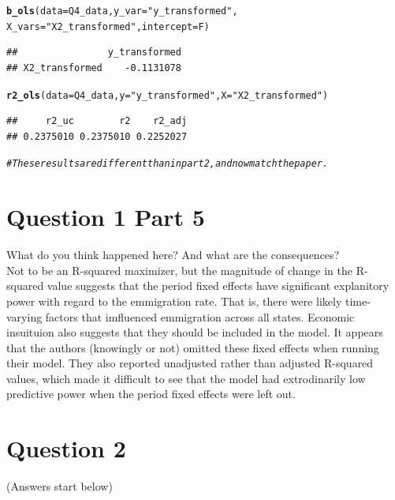 \documentclass[english, 11pt]{article}\usepackage[]{graphicx}\usepackage[]{color}
\makeatletter
\newcommand{\hlstr}[1]{\textcolor[rgb]{0.192,0.494,0.8}{#1}}%
\newcommand{\hlcom}[1]{\textcolor[rgb]{0.678,0.584,0.686}{\textit{#1}}}%
\newcommand{\hlstd}[1]{\textcolor[rgb]{0.345,0.345,0.345}{#1}}%
\newcommand{\hlkwc}[1]{\textcolor[rgb]{0.333,0.667,0.333}{#1}}%
\newcommand{\hlkwd}[1]{\textcolor[rgb]{0.737,0.353,0.396}{\textbf{#1}}}%
\newenvironment{kframe}{%
 \def\at@end@of@kframe{}%
 \ifinner\ifhmode%
  \def\at@end@of@kframe{\end{minipage}}%
  \begin{minipage}{\columnwidth}%
 \fi\fi%
 \def\FrameCommand##1{\hskip\@totalleftmargin \hskip-\fboxsep
 \colorbox{shadecolor}{##1}\hskip-\fboxsep
     \hskip-\linewidth \hskip-\@totalleftmargin \hskip\columnwidth}%
 \MakeFramed {\advance\hsize-\width
   \@totalleftmargin\z@ \linewidth\hsize
   \@setminipage}}%
 {\par\unskip\endMakeFramed%
 \at@end@of@kframe}
\newenvironment{knitrout}{}{} %
\makeatother
\begin{document}
\begin{knitrout}
\begin{kframe}
\begin{alltt}
\hlkwd{b_ols}\hlstd{(}\hlkwc{data} \hlstd{= Q4_data,} \hlkwc{y_var} \hlstd{=} \hlstr{"y_transformed"}\hlstd{,}
      \hlkwc{X_vars} \hlstd{=} \hlstr{"X2_transformed"}\hlstd{,} \hlkwc{intercept} \hlstd{= F)}
\end{alltt}
\begin{verbatim}
##                y_transformed
## X2_transformed    -0.1131078
\end{verbatim}
\begin{alltt}
\hlkwd{r2_ols}\hlstd{(}\hlkwc{data} \hlstd{= Q4_data,} \hlkwc{y} \hlstd{=} \hlstr{"y_transformed"}\hlstd{,} \hlkwc{X} \hlstd{=} \hlstr{"X2_transformed"}\hlstd{)}
\end{alltt}
\begin{verbatim}
##     r2_uc        r2    r2_adj 
## 0.2375010 0.2375010 0.2252027
\end{verbatim}
\begin{alltt}
\hlcom{# These results are different than in part 2, and now match the paper. }
\end{alltt}
\end{kframe}
\end{knitrout}

\noindent \section*{Question 1 Part 5} What do you think happened here? And what are the consequences?\\
\vspace{2mm}
\newline
\noindent Not to be an R-squared maximizer, but the magnitude of change in the R-squared value suggests that the period fixed effects have significant explanitory power with regard to the emmigration rate. That is, there were likely time-varying factors that imfluenced emmigration across all states. Economic insuituion also suggests that they should be included in the model. It appears that the authors (knowingly or not) omitted these fixed effects when running their model. They also reported unadjusted rather than adjusted R-squared values, which made it difficult to see that the model had extrodinarily low predictive power when the period fixed effects were left out. 

\newpage
\noindent \section*{Question 2} (Answers start below)
\end{document}
